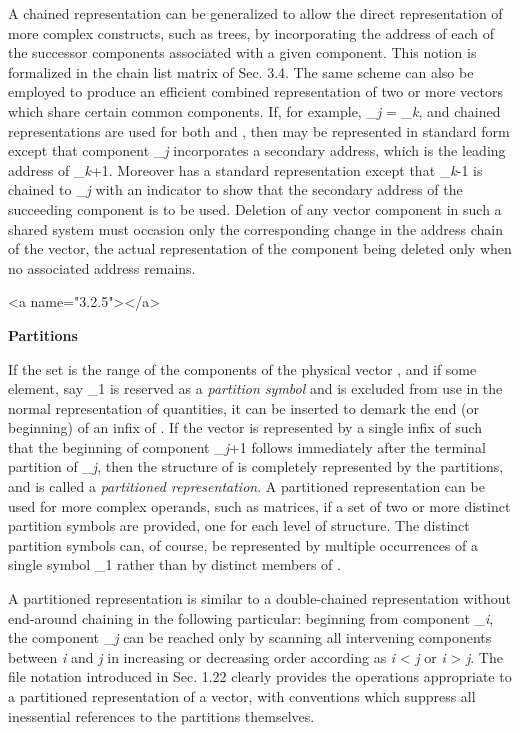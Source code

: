 {\par A chained representation can be generalized to allow the direct representation of more complex constructs, such as trees, by incorporating the address of each of the successor components associated with a given component. This notion is formalized in the chain list matrix of Sec. 3.4. The same scheme can also be employed to produce an efficient combined representation of two or more vectors which share certain common components. If, for example, _{\textit{j}} = _{\textit{k}}, and chained representations are used for both  and , then  may be represented in standard form except that component _{\textit{j}} incorporates a secondary address, which is the leading address of _{\textit{k}+1}. Moreover  has a standard representation except that _{\textit{k}-1} is chained to _{\textit{j}} with an indicator to show that the secondary address of the succeeding component is to be used. Deletion of any vector component in such a shared system must occasion only the corresponding change in the address chain of the vector, the actual representation of the component being deleted only when no associated address remains.



<a name="3.2.5"></a>
\par \textbf{Partitions}

\par If the set  is the range of the components of the physical vector \textbf{\pi}, and if some element, say _{1} is reserved as a \textit{partition symbol} and is excluded from use in the normal representation of quantities, it can be inserted to demark the end (or beginning) of an infix of \textbf{\pi}. If the vector  is represented by a single infix of \textbf{\pi} such that the beginning of component 
_{\textit{j}+1} follows immediately after the terminal partition of
_{\textit{j}}, then the structure of
 is completely represented by the partitions, and  is called a \textit{partitioned representation}. A partitioned representation can be used for more complex operands, such as matrices, if a set of two or more distinct partition symbols are provided, one for each level of structure. The distinct partition symbols can, of course, be represented by multiple occurrences of a single symbol _{1} rather than by distinct members of .

\par A partitioned representation is similar to a double-chained representation without end-around chaining in the following particular: beginning from component _{\textit{i}}, the component _{\textit{j}} can be reached only by scanning all intervening components between \textit{i} and \textit{j} in increasing or decreasing order according as \textit{i} < \textit{j} or \textit{i} > \textit{j}. The file notation introduced in Sec. 1.22 clearly provides the operations appropriate to a partitioned representation of a vector, with conventions which suppress all inessential references to the partitions themselves.

}
